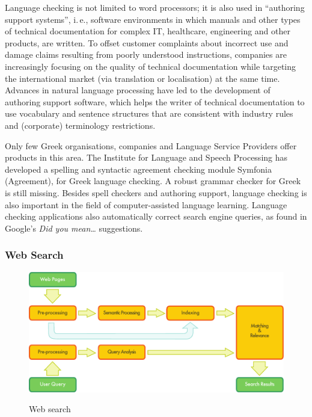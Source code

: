 \begin{multicols}{2}

Language checking is not limited to word processors; it is also used in “authoring support systems”, i.\,e., software environments in which manuals and other types of technical documentation for complex IT, healthcare, engineering and other products, are written. To offset customer complaints about incorrect use and damage claims resulting from poorly understood instructions, companies are increasingly focusing on the quality of technical documentation while targeting the international market (via translation or localisation) at the same time. Advances in natural language processing have led to the development of authoring support software, which helps the writer of technical documentation to use vocabulary and sentence structures that are consistent with industry rules and (corporate) terminology restrictions.

Only few Greek organisations, companies and Language Service Providers offer products in this area. The Institute for Language and Speech Processing has developed a spelling and syntactic agreement checking module Symfonia (Agreement), for Greek language checking. A robust grammar checker for Greek is still missing.
Besides spell checkers and authoring support, language checking is also important in the field of computer-assisted language learning. Language checking applications also automatically correct search engine queries, as found in Google's \textit{Did you mean…} suggestions.

\subsubsection{Web Search}

\begin{figure}[htb]
  \center
  \includegraphics[width=\textwidth]{../_media/english/web_search_architecture}
  \caption{Web search}
   \label{fig:websearcharch_en}
 \end{figure}


\end{multicols}
